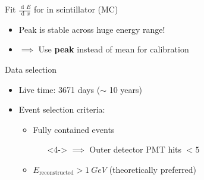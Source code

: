 \documentclass[14pt]{beamer}
\newcommand{\der}[2]{\frac{\operatorname{d\!}{}#1}{\operatorname{d\!}{}#2}}
\begin{document}
\begin{frame}{Fit $\der{E}{x}$ for \Pmu in scintillator (MC)}
	\centering
	\begin{itemize}
		\item<2-> Peak is stable across huge energy range!
		\item<3-> $\implies$ Use \textbf{peak} instead of mean for calibration
	\end{itemize}
\end{frame}

\begin{frame}{Data selection}
	\begin{itemize}
		\item<1-> Live time: 3671 days ($\sim$ 10 years)
		\item<2-> Event selection criteria:
			\begin{itemize}
				\item<3-> Fully contained events
					\begin{itemize}
						\item[]<4-> $\implies$ Outer detector PMT hits $< 5$
					\end{itemize}
				\item<5-> $E_{\text{reconstructed}} > \SI{1}{GeV}$
					(theoretically preferred)
			\end{itemize}
	\end{itemize}
\end{frame}
\end{document}

